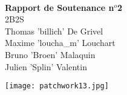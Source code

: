 \documentclass[14pt,a4paper]{report}
\begin{document}
\pagestyle{empty}

\begin{center}
\rule{0cm}{19mm} \\

{\Huge \textbf{Rapport de Soutenance n$^o$2}} \\[23mm]

{\huge 2B2S} \\[8mm]

Thomas 'billich' De Grivel \\
Maxime 'loucha\_m' Louchart \\
Bruno 'Broen' Malaquin \\
Julien 'Splin' Valentin \\[32mm]

\centerline{{\texttt{[image: patchwork13.jpg]}}}

\end{center}

\newpage
\setcounter{page}{1}

\tableofcontents

\newpage








\end{document}
